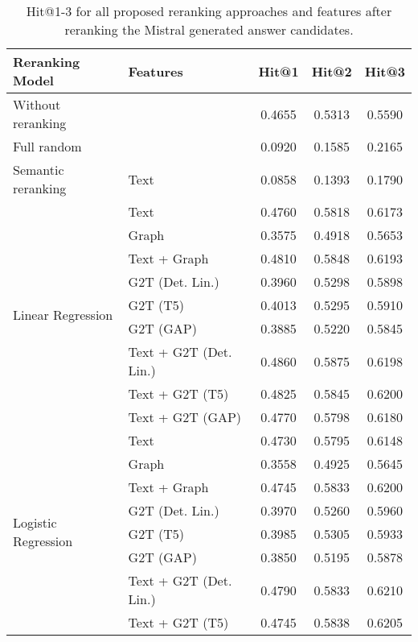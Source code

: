 \begin{table}[htbp]
    \setlength{\tabcolsep}{3pt}
    \caption{Hit@1-3 for all proposed reranking approaches and features after reranking the Mistral generated answer candidates.}
    \label{tab:controllable_fusion:mistral_all_results}
    \fontsize{9pt}{11pt}\selectfont
    \centering
    \begin{tabular}{l p{5cm} c c c}
        \toprule
        \textbf{Reranking Model} & \textbf{Features} & \textbf{Hit@1} & \textbf{Hit@2} & \textbf{Hit@3} \\
        \midrule
        Without reranking & & 0.4655 & 0.5313 & 0.5590 \\
        \cmidrule(lr){1-5}
        Full random & & 0.0920 & 0.1585 & 0.2165 \\
        \cmidrule(lr){1-5}
        Semantic reranking & Text & 0.0858 & 0.1393 & 0.1790 \\
        \cmidrule(lr){1-5}
        \multirow{9}{*}{Linear Regression} & Text & 0.4760 & 0.5818 & 0.6173 \\
        & Graph & 0.3575 & 0.4918 & 0.5653 \\
        & Text + Graph & 0.4810 & 0.5848 & 0.6193 \\
        & G2T (Det. Lin.) & 0.3960 & 0.5298 & 0.5898 \\
        & G2T (T5) & 0.4013 & 0.5295 & 0.5910 \\
        & G2T (GAP) & 0.3885 & 0.5220 & 0.5845 \\
        & Text + G2T (Det. Lin.) & 0.4860 & 0.5875 & 0.6198 \\
        & Text + G2T (T5) & 0.4825 & 0.5845 & 0.6200 \\
        & Text + G2T (GAP) & 0.4770 & 0.5798 & 0.6180 \\
        \midrule
        \multirow{12}{*}{Logistic Regression} & Text & 0.4730 & 0.5795 & 0.6148 \\
        & Graph & 0.3558 & 0.4925 & 0.5645 \\
        & Text + Graph & 0.4745 & 0.5833 & 0.6200 \\
        & G2T (Det. Lin.) & 0.3970 & 0.5260 & 0.5960 \\
        & G2T (T5) & 0.3985 & 0.5305 & 0.5933 \\
        & G2T (GAP) & 0.3850 & 0.5195 & 0.5878 \\
        & Text + G2T (Det. Lin.) & 0.4790 & 0.5833 & 0.6210 \\
        & Text + G2T (T5) & 0.4745 & 0.5838 & 0.6205 \\

\end{tabular}
\end{table}
